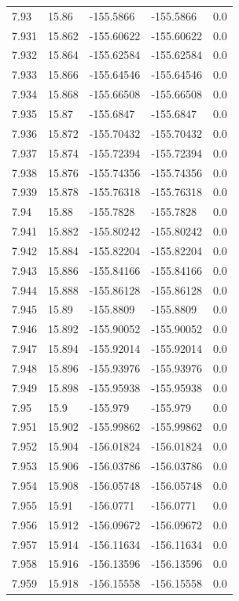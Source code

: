 \begin{tabular}{lllll}
7.93 & 15.86 & -155.5866 & -155.5866 & 0.0 \\
7.931 & 15.862 & -155.60622 & -155.60622 & 0.0 \\
7.932 & 15.864 & -155.62584 & -155.62584 & 0.0 \\
7.933 & 15.866 & -155.64546 & -155.64546 & 0.0 \\
7.934 & 15.868 & -155.66508 & -155.66508 & 0.0 \\
7.935 & 15.87 & -155.6847 & -155.6847 & 0.0 \\
7.936 & 15.872 & -155.70432 & -155.70432 & 0.0 \\
7.937 & 15.874 & -155.72394 & -155.72394 & 0.0 \\
7.938 & 15.876 & -155.74356 & -155.74356 & 0.0 \\
7.939 & 15.878 & -155.76318 & -155.76318 & 0.0 \\
7.94 & 15.88 & -155.7828 & -155.7828 & 0.0 \\
7.941 & 15.882 & -155.80242 & -155.80242 & 0.0 \\
7.942 & 15.884 & -155.82204 & -155.82204 & 0.0 \\
7.943 & 15.886 & -155.84166 & -155.84166 & 0.0 \\
7.944 & 15.888 & -155.86128 & -155.86128 & 0.0 \\
7.945 & 15.89 & -155.8809 & -155.8809 & 0.0 \\
7.946 & 15.892 & -155.90052 & -155.90052 & 0.0 \\
7.947 & 15.894 & -155.92014 & -155.92014 & 0.0 \\
7.948 & 15.896 & -155.93976 & -155.93976 & 0.0 \\
7.949 & 15.898 & -155.95938 & -155.95938 & 0.0 \\
7.95 & 15.9 & -155.979 & -155.979 & 0.0 \\
7.951 & 15.902 & -155.99862 & -155.99862 & 0.0 \\
7.952 & 15.904 & -156.01824 & -156.01824 & 0.0 \\
7.953 & 15.906 & -156.03786 & -156.03786 & 0.0 \\
7.954 & 15.908 & -156.05748 & -156.05748 & 0.0 \\
7.955 & 15.91 & -156.0771 & -156.0771 & 0.0 \\
7.956 & 15.912 & -156.09672 & -156.09672 & 0.0 \\
7.957 & 15.914 & -156.11634 & -156.11634 & 0.0 \\
7.958 & 15.916 & -156.13596 & -156.13596 & 0.0 \\
7.959 & 15.918 & -156.15558 & -156.15558 & 0.0 \\

\end{tabular}

